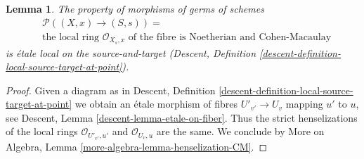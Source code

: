 \documentclass[10pt,a4paper]{amsart}
\theoremstyle{plain}
\newtheorem{lemma}[subsection]{Lemma}
\theoremstyle{definition}
\theoremstyle{remark}
\numberwithin{equation}{subsection}
\begin{document}
\begin{lemma}
\label{lemma-CM-local-ring-fibre}
The property of morphisms of germs of schemes
\begin{align*}
& \mathcal{P}((X, x) \to (S, s)) = \\
& \text{the local ring }
\mathcal{O}_{X_s, x}
\text{ of the fibre is Noetherian and Cohen-Macaulay}
\end{align*}
is \'etale local on the source-and-target (Descent, Definition
\ref{descent-definition-local-source-target-at-point}).
\end{lemma}

\begin{proof}
Given a diagram as in
Descent, Definition \ref{descent-definition-local-source-target-at-point}
we obtain an \'etale morphism of fibres
$U'_{v'} \to U_v$ mapping $u'$ to $u$, see
Descent, Lemma \ref{descent-lemma-etale-on-fiber}.
Thus the strict henselizations of the local rings
$\mathcal{O}_{U'_{v'}, u'}$ and $\mathcal{O}_{U_v, u}$
are the same. We conclude by
More on Algebra, Lemma \ref{more-algebra-lemma-henselization-CM}.
\end{proof}
\end{document}
